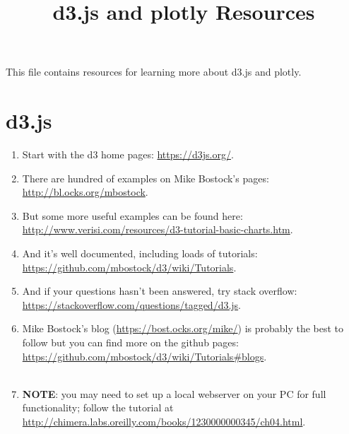 \documentclass[a4paper]{article}
\title{d3.js and plotly Resources}
\begin{document}
    \maketitle
    This file contains resources for learning more about d3.js and plotly.\\

    \section{d3.js}
    \begin{enumerate}
        \item Start with the d3 home pages: \url{https://d3js.org/}.\\
        \item There are hundred of examples on Mike Bostock's pages: \url{http://bl.ocks.org/mbostock}.\\
        \item But some more useful examples can be found here: \url{http://www.verisi.com/resources/d3-tutorial-basic-charts.htm}.\\
        \item And it's well documented, including loads of tutorials: \url{https://github.com/mbostock/d3/wiki/Tutorials}.\\
        \item And if your questions hasn't been answered, try stack overflow: \url{https://stackoverflow.com/questions/tagged/d3.js}.\\
        \item Mike Bostock's blog (\url{https://bost.ocks.org/mike/}) is probably the best to follow but you can find more on the github pages: \url{https://github.com/mbostock/d3/wiki/Tutorials#blogs}.\\
        \\
        \item \textbf{NOTE}: you may need to set up a local webserver on your PC for full functionality; follow the tutorial at \url{http://chimera.labs.oreilly.com/books/1230000000345/ch04.html}.\\
    \end{enumerate}
\end{document}
